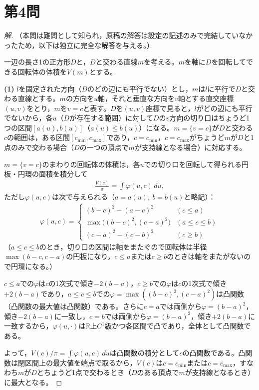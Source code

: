 \documentclass[../main.tex]{subfiles}
\begin{document}
\newpage

\section*{第4問}

\begin{proof}[解]
  （本問は難問として知られ，原稿の解答は設定の記述のみで完結していなかったため，以下は独立に完全な解答を与える。）

  一辺の長さ1の正方形$D$と，$D$と交わる直線$m$を考える。$m$を軸に$D$を回転してできる回転体の体積を$V(m)$とする。

  \textbf{(1)} $l$を固定された方向（$D$のどの辺にも平行でない）とし，$m$は$l$に平行で$D$と交わる直線とする。$m$の方向を$u$軸，それと垂直な方向を$v$軸とする直交座標$(u,v)$をとり，$m$を$v=c$と表す。$D$を$(u,v)$座標で見ると，$l$がどの辺にも平行でないから，各$u$（$D$が存在する範囲）に対して$D$の$v$方向の切り口はちょうど1つの区間$[a(u),b(u)]$（$a(u)\le b(u)$）になる。$m=\{v=c\}$が$D$と交わる$c$の範囲は，ある区間$[c_{\min},c_{\max}]$であり，$c=c_{\min}$，$c=c_{\max}$がちょうど$m$が$D$と1点のみで交わる場合（$D$の一つの頂点で$m$が支持線となる場合）に対応する。

  $m=\{v=c\}$のまわりの回転体の体積は，各$u$での切り口を回転して得られる円板・円環の面積を積分して
  \begin{align*}
    \frac{V(c)}\pi=\int\varphi(u,c)\,du,
  \end{align*}
  ただし$\varphi(u,c)$は次で与えられる（$a=a(u),\ b=b(u)$と略記）：
  \begin{align*}
    \varphi(u,c)=
    \begin{cases}
      (b-c)^2-(a-c)^2 & (c\le a)\\
      \max\bigl((b-c)^2,(c-a)^2\bigr) & (a\le c\le b)\\
      (c-a)^2-(c-b)^2 & (c\ge b)
    \end{cases}
  \end{align*}
  （$a\le c\le b$のとき，切り口の区間は軸をまたぐので回転体は半径$\max(b-c,c-a)$の円板になり，$c\le a$または$c\ge b$のときは軸をまたがないので円環になる。）

  $c\le a$での$\varphi$は$c$の1次式で傾き$-2(b-a)$，$c\ge b$での$\varphi$は$c$の1次式で傾き$+2(b-a)$であり，$a\le c\le b$での$\varphi=\max((b-c)^2,(c-a)^2)$は凸関数（凸関数の最大値は凸関数）である。さらに$c=a$では両側から$\varphi=(b-a)^2$，傾き$-2(b-a)$に一致し，$c=b$では両側から$\varphi=(b-a)^2$，傾き$+2(b-a)$に一致するから，$\varphi(u,\cdot)$は$\mathbb R$上$C^1$級かつ各区間で凸であり，全体として凸関数である。

  よって，$V(c)/\pi=\int\varphi(u,c)\,du$は凸関数の積分として$c$の凸関数である。凸関数は閉区間上の最大値を端点で取るから，$V(c)$は$c=c_{\min}$または$c=c_{\max}$，すなわち$m$が$D$とちょうど1点で交わるとき（$D$のある頂点で$m$が支持線となるとき）に最大となる。
\end{proof}
\end{document}
